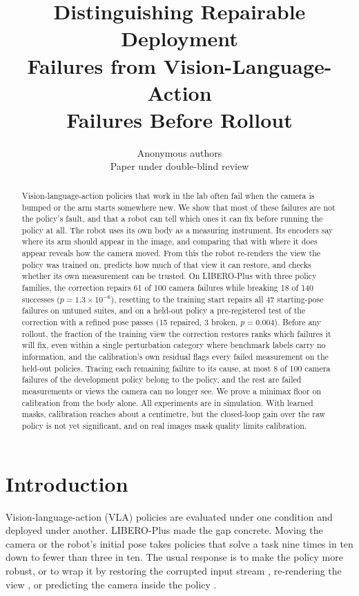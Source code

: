\documentclass{article}
\title{Distinguishing Repairable Deployment\\ Failures from Vision-Language-Action\\ Failures Before Rollout}
\author{Anonymous authors\\ Paper under double-blind review}
\begin{document}
\maketitle

\begin{abstract}
Vision-language-action policies that work in the lab often fail when the camera is bumped or the arm starts somewhere
new. We show that most of these failures are not the policy's fault, and that a robot can tell which ones it can fix
before running the policy at all. The robot uses its own body as a measuring instrument. Its encoders say where its arm
should appear in the image, and comparing that with where it does appear reveals how the camera moved. From this the
robot re-renders the view the policy was trained on, predicts how much of that view it can restore, and checks whether
its own measurement can be trusted. On LIBERO-Plus with three policy families, the correction repairs 61 of 100 camera
failures while breaking 18 of 140 successes ($p = 1.3\times10^{-6}$), resetting to the training start repairs all 47
starting-pose failures on untuned suites, and on a held-out policy a pre-registered test of the correction with a
refined pose passes (15 repaired, 3 broken, $p = 0.004$). Before any rollout, the fraction of the training view the
correction restores ranks which failures it will fix, even within a single perturbation category where benchmark labels
carry no information, and the calibration's own residual flags every failed measurement on the held-out policies.
Tracing each remaining failure to its cause, at most 8 of 100 camera failures of the development policy belong to the
policy, and the rest are failed measurements or views the camera can no longer see. We prove a minimax floor on
calibration from the body alone. All experiments are in simulation. With learned masks, calibration reaches about a
centimetre, but the closed-loop gain over the raw policy is not yet significant, and on real images mask quality
limits calibration.
\end{abstract}

\section{Introduction}

Vision-language-action (VLA) policies are evaluated under one condition and deployed under another. LIBERO-Plus
\citep{liberoplus} made the gap concrete. Moving the camera or the robot's initial pose takes policies that solve a
task nine times in ten down to fewer than three in ten. The usual response is to make the policy more robust, or to
wrap it by restoring the corrupted input stream \citep{rightstream,crt,byovla}, re-rendering the view
\citep{anycamvla,vistabot,gsvla}, or predicting the camera inside the policy \citep{fixedtofree}.
\end{document}
